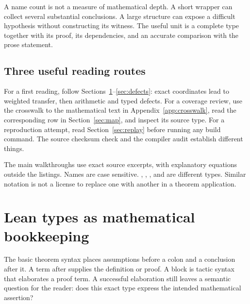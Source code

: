 A name count is not a measure of mathematical depth. A short wrapper can collect several substantial conclusions. A large structure can expose a difficult hypothesis without constructing its witness. The useful unit is a complete type together with its proof, its dependencies, and an accurate comparison with the prose statement.

\subsection{Three useful reading routes}

For a first reading, follow Sections~\ref{sec:types}--\ref{sec:defects}: exact coordinates lead to weighted transfer, then arithmetic and typed defects. For a coverage review, use the crosswalk to the mathematical text in Appendix~\ref{app:crosswalk}, read the corresponding row in Section~\ref{sec:map}, and inspect its source type. For a reproduction attempt, read Section~\ref{sec:replay} before running any build command. The source checksum check and the compiler audit establish different things.

The main walkthroughs use exact source excerpts, with explanatory equations outside the listings. Names are case sensitive. , , , and  are different types. Similar notation is not a license to replace one with another in a theorem application.

\section{Lean types as mathematical bookkeeping}\label{sec:types}

The basic theorem syntax places assumptions before a colon and a conclusion after it. A term after \code{:=} supplies the definition or proof. A  block is tactic syntax that elaborates a proof term. A successful elaboration still leaves a semantic question for the reader: does this exact type express the intended mathematical assertion?

